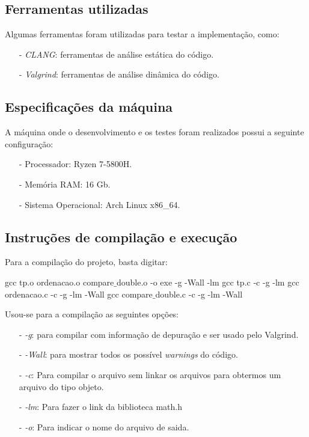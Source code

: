 \documentclass{article}
\begin{document}
\subsection{Ferramentas utilizadas}
Algumas ferramentas foram utilizadas para testar a implementação, como:

\begin{itemize}
    \item[-] \textit{CLANG}: ferramentas de análise estática do código.
    \item[-] \textit{Valgrind}: ferramentas de análise dinâmica do código.
\end{itemize}

\subsection{Especificações da máquina}
A máquina onde o desenvolvimento e os testes foram realizados possui a seguinte configuração:

\begin{itemize}
    \item[-] Processador: Ryzen 7-5800H.
    \item[-] Memória RAM: 16 Gb.
    \item[-] Sistema Operacional: Arch Linux x86\_64.
\end{itemize}


\subsection{Instruções de compilação e execução}

Para a compilação do projeto, basta digitar:

\begin{tcolorbox}[title=Compilando o projeto,width=\linewidth]
    gcc tp.o ordenacao.o compare$\_$double.o -o exe -g -Wall -lm\newline
    gcc tp.c -c -g -lm\newline
    gcc ordenacao.c -c -g -lm -Wall\newline
    gcc compare$\_$double.c -c -g -lm -Wall
\end{tcolorbox}

Usou-se para a compilação as seguintes opções:

\begin{itemize}
    \item [-] \emph{-g}: para compilar com informação de depuração e ser usado pelo Valgrind.
    \item [-] \emph{-Wall}: para mostrar todos os possível \emph{warnings} do código.
    \item [-] \emph{-c}: Para compilar o arquivo sem linkar os arquivos para obtermos um arquivo do tipo objeto.
    \item [-] \emph{-lm}: Para fazer o link da biblioteca math.h
    \item [-] \emph{-o}: Para indicar o nome do arquivo de saida.

\end{itemize}
\end{document}
